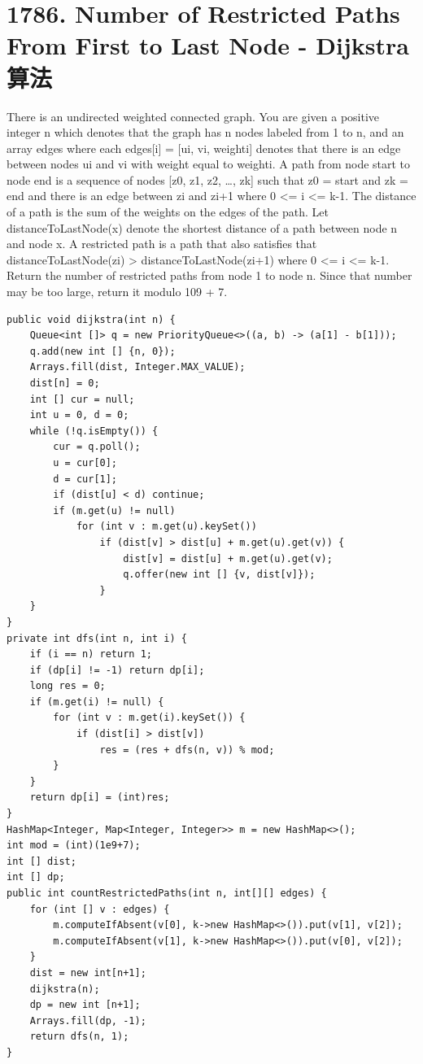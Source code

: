 \documentclass[9pt, b5paaper]{book}
\begin{document}
\section{1786. Number of Restricted Paths From First to Last Node - Dijkstra算法}
\label{sec-2-18}
There is an undirected weighted connected graph. You are given a positive integer n which denotes that the graph has n nodes labeled from 1 to n, and an array edges where each edges[i] = [ui, vi, weighti] denotes that there is an edge between nodes ui and vi with weight equal to weighti.
A path from node start to node end is a sequence of nodes [z0, z1, z2, \ldots{}, zk] such that z0 = start and zk = end and there is an edge between zi and zi+1 where 0 <= i <= k-1.
The distance of a path is the sum of the weights on the edges of the path. Let distanceToLastNode(x) denote the shortest distance of a path between node n and node x. A restricted path is a path that also satisfies that distanceToLastNode(zi) > distanceToLastNode(zi+1) where 0 <= i <= k-1.
Return the number of restricted paths from node 1 to node n. Since that number may be too large, return it modulo 109 + 7.
\begin{verbatim}
public void dijkstra(int n) {
    Queue<int []> q = new PriorityQueue<>((a, b) -> (a[1] - b[1]));
    q.add(new int [] {n, 0});
    Arrays.fill(dist, Integer.MAX_VALUE);
    dist[n] = 0;
    int [] cur = null;
    int u = 0, d = 0;
    while (!q.isEmpty()) {
        cur = q.poll();
        u = cur[0];
        d = cur[1];
        if (dist[u] < d) continue;
        if (m.get(u) != null) 
            for (int v : m.get(u).keySet()) 
                if (dist[v] > dist[u] + m.get(u).get(v)) {
                    dist[v] = dist[u] + m.get(u).get(v);
                    q.offer(new int [] {v, dist[v]});
                }
    }
}
private int dfs(int n, int i) { 
    if (i == n) return 1;
    if (dp[i] != -1) return dp[i];
    long res = 0;
    if (m.get(i) != null) {
        for (int v : m.get(i).keySet()) {
            if (dist[i] > dist[v])
                res = (res + dfs(n, v)) % mod;
        }
    }
    return dp[i] = (int)res;
}
HashMap<Integer, Map<Integer, Integer>> m = new HashMap<>();
int mod = (int)(1e9+7);
int [] dist;
int [] dp;
public int countRestrictedPaths(int n, int[][] edges) {
    for (int [] v : edges) {
        m.computeIfAbsent(v[0], k->new HashMap<>()).put(v[1], v[2]);
        m.computeIfAbsent(v[1], k->new HashMap<>()).put(v[0], v[2]);
    }
    dist = new int[n+1];
    dijkstra(n);
    dp = new int [n+1];
    Arrays.fill(dp, -1);
    return dfs(n, 1);
}
\end{verbatim}
\end{document}
